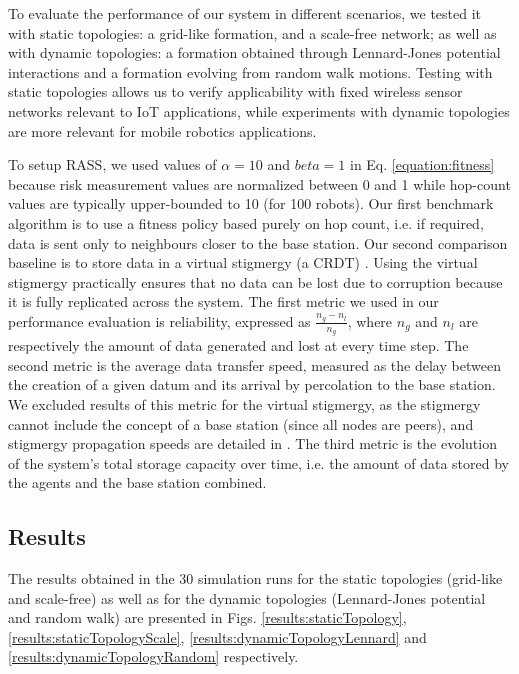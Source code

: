 \documentclass[letterpaper, 10 pt, conference]{ieeeconf}
\begin{document}
To evaluate the performance of our system in different scenarios, we tested it with static topologies: a grid-like formation, and a scale-free network; as well as with dynamic topologies: a formation obtained through Lennard-Jones potential interactions and a formation evolving from random walk motions. Testing with static topologies allows us to verify applicability with fixed wireless sensor networks relevant to IoT applications, while experiments with dynamic topologies are more relevant for mobile robotics applications.

To setup RASS, we used values of $\alpha = 10$ and $beta = 1$ in Eq. \ref{equation:fitness} because risk measurement values are normalized between 0 and 1 while hop-count values are typically upper-bounded to 10 (for 100 robots). Our first benchmark algorithm is to use a fitness policy based purely on hop count, i.e. if required, data is sent only to neighbours closer to the base station. Our second comparison baseline is to store data in a virtual stigmergy (a CRDT) \cite{pinciroliTuple2016}. Using the virtual stigmergy practically ensures that no data can be lost due to corruption because it is fully replicated across the system. The first metric we used in our performance evaluation is reliability, expressed as $\frac{n_g - n_l}{n_g}$, where $n_g$ and $n_l$ are respectively the amount of data generated and lost at every time step. The second metric is the average data transfer speed, measured as the delay between the creation of a given datum and its arrival by percolation to the base station. We excluded results of this metric for the virtual stigmergy, as the stigmergy cannot include the concept of a base station (since all nodes are peers), and stigmergy propagation speeds are detailed in \cite{pinciroliTuple2016}. The third metric is the evolution of the system's total storage capacity over time, i.e. the amount of data stored by the agents and the base station combined.


\subsection{Results}

The results obtained in the 30 simulation runs for the static topologies (grid-like and scale-free) as well as for the dynamic topologies (Lennard-Jones potential and random walk) are presented in Figs. \ref{results:staticTopology}, \ref{results:staticTopologyScale}, \ref{results:dynamicTopologyLennard} and  \ref{results:dynamicTopologyRandom} respectively.
\end{document}
